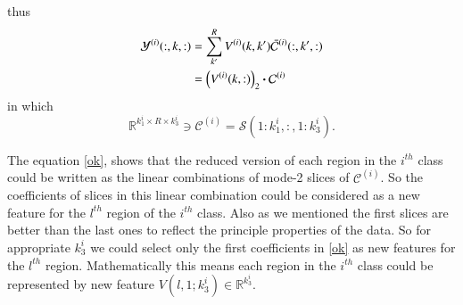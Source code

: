 \documentclass[preprint,12pt]{elsarticle}
\newcommand{\trans}{\mathsf{T}}
\begin{document}
thus
\begin{align}
\label{ok}
{\mathcal{Y}}^{(i)}(:,k,:) &= \sum_{k'}^{R} V^{(i)}(k,k')\bar{\mathcal{C}}^{(i)}(:,k',:) \notag
\\&= \left( V^{(i)}(k,:)\right)_2 \boldsymbol{\cdot} {\mathcal{C}}^{(i)}
\end{align}
in which 
\[
\mathbb{R}^{k_1^i\times R \times k_3^i}\ni {\mathcal{C}}^{(i)} = \mathcal{S}(1:k_1^i,:,1:k_3^i).
\]

The equation \eqref{ok}, shows that the reduced version of each region in the $i^{th}$ class could be
written as the linear combinations of  mode-2 slices of $\mathcal{C}^{(i)}$. So the coefficients of slices in this linear combination could be considered as a new feature for the $l^{th}$ region of the $i^{th}$ class. Also as we mentioned the first slices are better than the last ones to reflect the principle properties of the data. So for appropriate $k_3^i$ we could select only the first coefficients in \eqref{ok} as  new features for the $l^{th}$ region. Mathematically this means each region  in the $i^{th}$ class could be represented by new feature $V(l,1;k_3^i)\in \mathbb{R}^{k_3^i}$.   
\end{document}
